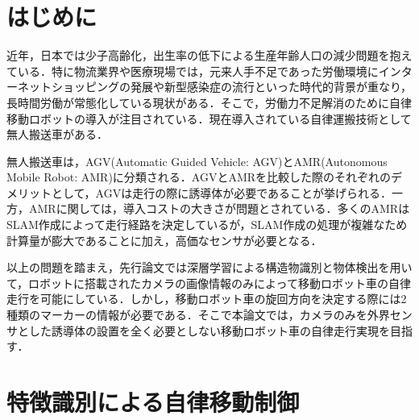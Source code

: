 \documentclass[luatex,fleqn,twocolumn,twoside]{ltjarticle}
\begin{document}
\section{\large はじめに}
近年，日本では少子高齢化，出生率の低下による生産年齢人口の減少問題を抱えている．特に物流業界や医療現場では，元来人手不足であった労働環境にインターネットショッピングの発展や新型感染症の流行といった時代的背景が重なり，長時間労働が常態化している現状がある．そこで，労働力不足解消のために自律移動ロボットの導入が注目されている．現在導入されている自律運搬技術として無人搬送車がある．

無人搬送車は，AGV(Automatic Guided Vehicle: AGV)とAMR(Autonomous Mobile Robot: AMR)に分類される．AGVとAMRを比較した際のそれぞれのデメリットとして，AGVは走行の際に誘導体が必要であることが挙げられる．一方，AMRに関しては，導入コストの大きさが問題とされている．多くのAMRはSLAM作成によって走行経路を決定しているが，SLAM作成の処理が複雑なため計算量が膨大であることに加え，高価なセンサが必要となる．

以上の問題を踏まえ，先行論文では深層学習による構造物識別と物体検出を用いて，ロボットに搭載されたカメラの画像情報のみによって移動ロボット車の自律走行を可能にしている．しかし，移動ロボット車の旋回方向を決定する際には2種類のマーカーの情報が必要である．そこで本論文では，カメラのみを外界センサとした誘導体の設置を全く必要としない移動ロボット車の自律走行実現を目指す．

\section{\large 特徴識別による自律移動制御}
\end{document}
